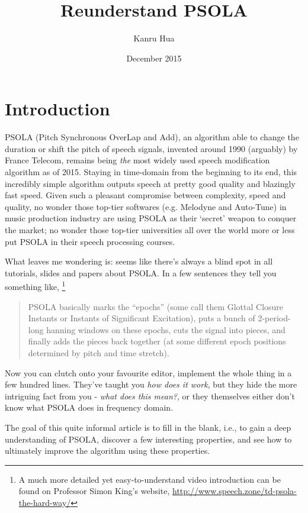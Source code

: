 \documentclass{article}
\title{Reunderstand PSOLA}
\author{Kanru Hua}
\date{December 2015}
\begin{document}
\maketitle

\section{Introduction}

PSOLA (Pitch Synchronous OverLap and Add)\cite{moulines}, an algorithm able to change the duration or shift the pitch of speech signals, invented around 1990 (arguably) by France Telecom, remains being \textit{the} most widely used speech modification algorithm as of 2015. Staying in time-domain from the beginning to its end, this incredibly simple algorithm outputs speech at pretty good quality and blazingly fast speed. Given such a pleasant compromise between complexity, speed and quality, no wonder those top-tier softwares (e.g. Melodyne\textsuperscript{\textregistered} and Auto-Tune\textsuperscript{\textregistered}) in music production industry are using PSOLA as their `secret' weapon to conquer the market; no wonder those top-tier universities all over the world more or less put PSOLA in their speech processing courses.

What leaves me wondering is: seems like there's always a blind spot in all tutorials, slides and papers about PSOLA. In a few sentences they tell you something like,
\footnote{A much more detailed yet easy-to-understand video introduction can be found on Professor Simon King's website, \url{http://www.speech.zone/td-psola-the-hard-way/}}
\begin{quote} PSOLA basically marks the ``epochs'' (some call them Glottal Closure Instants or Instants of Significant Excitation), puts a bunch of 2-period-long hanning windows on these epochs, cuts the signal into pieces, and finally adds the pieces back together (at some different epoch positions determined by pitch and time stretch). \end{quote}
Now you can clutch onto your favourite editor, implement the whole thing in a few hundred lines. They've taught you \textit{how does it work}, but they hide the more intriguing fact from you - \textit{what does this mean?}, or they themselves either don't know what PSOLA does in frequency domain.

The goal of this quite informal article is to fill in the blank, i.e., to gain a deep understanding of PSOLA, discover a few interesting properties, and see how to ultimately improve the algorithm using these properties.
\end{document}
